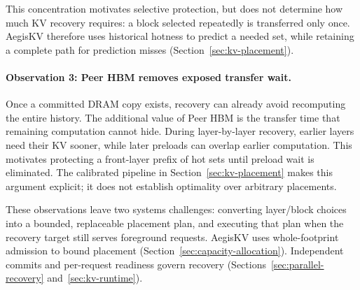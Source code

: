 This concentration motivates selective protection, but does not determine
how much KV recovery requires: a block selected repeatedly is transferred
only once. AegisKV therefore uses historical hotness to predict a needed
set, while retaining a complete path for prediction misses
(Section~\ref{sec:kv-placement}).

\paragraph{Observation 3: Peer HBM removes exposed transfer wait.}
Once a committed DRAM copy exists, recovery can already avoid recomputing
the entire history. The additional value of Peer HBM is the transfer time
that remaining computation cannot hide. During layer-by-layer recovery,
earlier layers need their KV sooner, while later preloads can overlap
earlier computation. This motivates protecting a front-layer prefix of
hot sets until preload wait is eliminated. The calibrated pipeline in
Section~\ref{sec:kv-placement} makes this argument explicit; it does not
establish optimality over arbitrary placements.

These observations leave two systems challenges: converting layer/block
choices into a bounded, replaceable placement plan, and executing that
plan when the recovery target still serves foreground requests.
AegisKV uses whole-footprint admission to bound placement
(Section~\ref{sec:capacity-allocation}). Independent commits and
per-request readiness govern recovery
(Sections~\ref{sec:parallel-recovery} and~\ref{sec:kv-runtime}).
